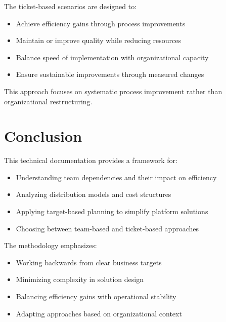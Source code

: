 \documentclass[12pt,a4paper]{article}
\newenvironment{explanation}
{\begin{mdframed}[style=explanationstyle,frametitle={Explanation}]}
{\end{mdframed}}
\begin{document}
\begin{explanation}
The ticket-based scenarios are designed to:
\begin{itemize}
    \item Achieve efficiency gains through process improvements
    \item Maintain or improve quality while reducing resources
    \item Balance speed of implementation with organizational capacity
    \item Ensure sustainable improvements through measured changes
\end{itemize}
This approach focuses on systematic process improvement rather than organizational restructuring.
\end{explanation}

\section{Conclusion}

\begin{explanation}
This technical documentation provides a framework for:
\begin{itemize}
    \item Understanding team dependencies and their impact on efficiency
    \item Analyzing distribution models and cost structures
    \item Applying target-based planning to simplify platform solutions
    \item Choosing between team-based and ticket-based approaches
\end{itemize}

The methodology emphasizes:
\begin{itemize}
    \item Working backwards from clear business targets
    \item Minimizing complexity in solution design
    \item Balancing efficiency gains with operational stability
    \item Adapting approaches based on organizational context
\end{itemize}
\end{explanation}
\end{document}
